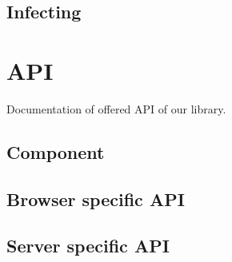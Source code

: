  \subsection{Infecting}\label{subsec:our-architecture-infecting}

\section{API}\label{sec:our-api}

  Documentation of offered API of our library.

  \subsection{Component}\label{subsec:our-api-component}
  \subsection{Browser specific API}\label{subsec:our-api-browser}
  \subsection{Server specific API}\label{subsec:our-api-server}
